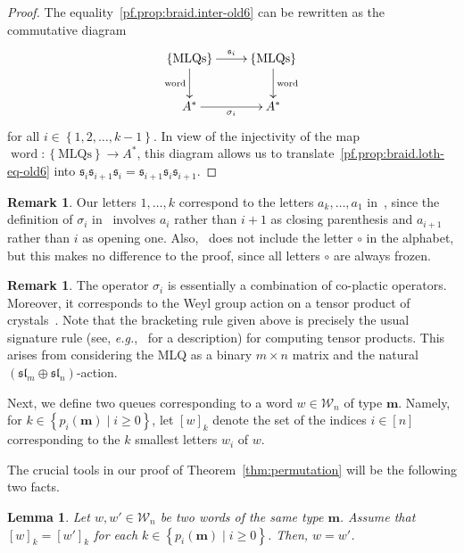 \documentclass[reqno]{amsart}
\newcommand{\0}{\phantom{c}}
\DeclareMathOperator{\word}{word} %
\newcommand{\mm}{\mathbf{m}}
\newcommand{\mcW}{\mathcal{W}}
\newcommand{\fraks}{\mathfrak{s}}
\newenvironment{verlong}{}{}
\newcommand{\set}[1]{\left\{ #1 \right\}}
\newcommand{\ive}[1]{\left[ #1 \right]}
\theoremstyle{plain}
\newtheorem{lemma}[thm]{Lemma}
\theoremstyle{definition}
\newtheorem{remark}[thm]{Remark}
\numberwithin{equation}{section}
\begin{document}
\begin{verlong}
\begin{proof}
The equality~\eqref{pf.prop:braid.inter-old6} can be rewritten as the
commutative diagram
\[
\xymatrix{
 \set{\text{MLQs}} \ar[r]^{\fraks_i} \ar[d]_{\word} & \set{\text{MLQs}} \ar[d]^{\word} \\
 A^* \ar[r]_{\sigma_i} & A^*
}
\]
for all $i \in \set{1, 2, \dotsc, k-1}$.
In view of the injectivity of the map $\word \colon \set{\text{MLQs}} \to A^*$,
this diagram allows us to translate~\eqref{pf.prop:braid.loth-eq-old6} into
$\fraks_i \fraks_{i+1} \fraks_i = \fraks_{i+1} \fraks_i \fraks_{i+1}$.
\end{proof}

\begin{remark}
Our letters $1, \ldots, k$ correspond to the letters
$a_k, \ldots, a_1$ in~\cite{Loth},
since the definition of $\sigma_i$ in~\cite{Loth} involves $a_i$ rather
than $i+1$ as closing parenthesis and $a_{i+1}$ rather than $i$ as opening one.
Also,~\cite{Loth} does not include the letter $\circ$ in the alphabet,
but this makes no difference to the proof, since all letters $\circ$ are always frozen.
\end{remark}

\begin{remark}
The operator $\sigma_i$ is essentially a combination of co-plactic operators.
Moreover, it corresponds to the Weyl group action on a tensor product of crystals~\cite{BS17}.
Note that the bracketing rule given above is precisely the usual signature rule (see, \textit{e.g.},~\cite[Sec.~2.4]{BS17} for a description) for computing tensor products.
This arises from considering the MLQ as a binary $m \times n$ matrix and the natural $(\mathfrak{sl}_m \oplus \mathfrak{sl}_n)$-action.
\end{remark}

Next, we define two queues corresponding to a word $w \in \mcW_n$ of type $\mm$.
Namely, for $k \in \set{p_i(\mm) \mid i \geq 0}$, let $[w]_k$ denote the set of the indices $i \in \ive{n}$
corresponding to the $k$ smallest letters $w_i$ of $w$.

The crucial tools in our proof of Theorem~\ref{thm:permutation} will be the following two facts.

\begin{lemma} \label{lem:SL.reconstruct-old6}
Let $w, w' \in \mcW_n$ be two words of the same type $\mm$.
Assume that $[w]_k = [w']_k$ for each $k \in \set{p_i(\mm) \mid i \geq 0}$.
Then, $w = w'$.
\end{lemma}


\end{verlong}
\end{document}
